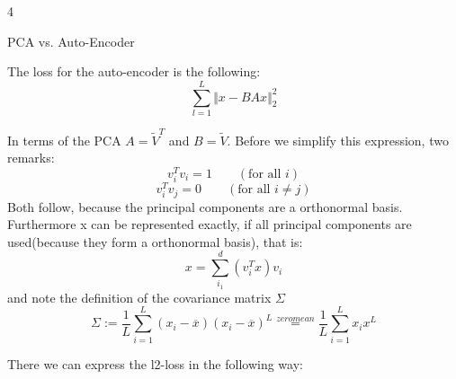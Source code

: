 \documentclass{article}
\begin{document}
\begin{ukon-infie}[28.1.18]{4}
\begin{exercise}[p=20]{PCA vs. Auto-Encoder}
{			The loss for the auto-encoder is the following:\\
			$$ \sum_{l=1}^L \Vert x - BAx\Vert_2^2$$
			
			In terms of the PCA $A = \tilde{V}^T$ and $B= \tilde{V}$.
			Before we simplify this expression, two remarks:\\
			\begin{equation}
			v_i^Tv_i = 1 \qquad (\text{for all } i)
			\end{equation}
			\begin{equation}
			v_i^Tv_j = 0 \qquad (\text{for all } i\not= j)
			\end{equation}
			Both follow, because the principal components are a orthonormal basis.\\
			
			Furthermore x can be represented exactly, if all principal components are used(because they form a orthonormal basis), that is:\\
			\begin{equation}
			x= \sum_{i_1}^d (v_i^T x)v_i
			\end{equation} 
			and note the definition of the covariance matrix $\Sigma$
			\begin{equation}
			\Sigma := \frac{1}{L} \sum_{i=1}^L(x_i - \overline{x})(x_i-\overline{x})^L \stackrel{zero mean}{=} \frac{1}{L} \sum_{i=1}^Lx_ix^L
			\end{equation}
			
			There we can express the l2-loss in the following way:
			
}
\end{exercise}
\end{ukon-infie}
\end{document}
